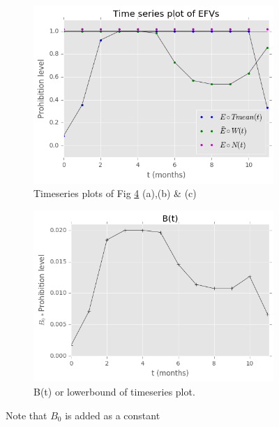 \documentclass[paper=a4, fontsize=11pt]{scrartcl}
\numberwithin{equation}{section}		%
\numberwithin{figure}{section}			%
\numberwithin{table}{section}				%
\begin{document}
\begin{figure}[ht]
\begin{subfigure}{.33\textwidth}
\caption{}
\label{E_N}
\end{subfigure}
\begin{subfigure}{.5\textwidth}
\includegraphics[scale=0.5]{timeseries_NWT.png}
\caption{Timeseries plots of Fig \ref{evaluation-explain} (a),(b) \& (c) }
\label{timeseries_NWT}
\end{subfigure}
\begin{subfigure}{.5\textwidth}
\includegraphics[scale=0.5]{B_t.png}
\caption{B(t) or lowerbound of timeseries plot.}
\label{B_t}
\end{subfigure}
\caption{ Note that $B_0$ is added as a constant}
\label{evaluation-explain}
\end{figure}
\end{document}
